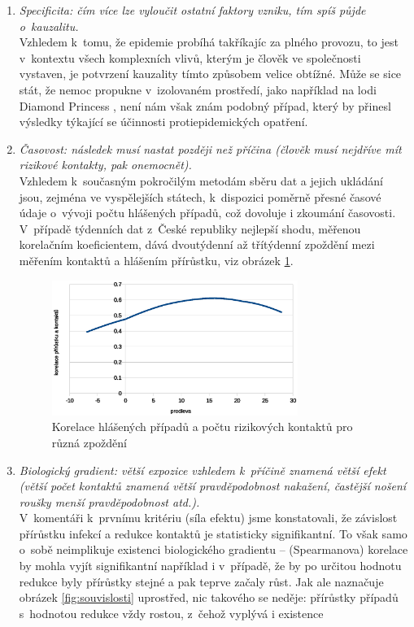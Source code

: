 \begin{enumerate}
\item \emph{Specificita: čím více lze vyloučit ostatní faktory vzniku, tím
spíš půjde o~kauzalitu.}\\
Vzhledem k~tomu, že epidemie probíhá takříkajíc za plného provozu,
to jest v~kontextu všech komplexních vlivů, kterým je člověk ve společnosti
vystaven, je potvrzení kauzality tímto způsobem velice obtížné.
Může se sice stát, že nemoc propukne v~izolovaném prostředí, jako
například na lodi Diamond Princess \cite{mizumoto2020transmission},
není nám však znám podobný případ, který by přinesl výsledky týkající
se účinnosti protiepidemických opatření. 
\item \emph{Časovost: následek musí nastat později než příčina (člověk musí
nejdříve mít rizikové kontakty, pak onemocnět).}\\
Vzhledem k~současným pokročilým metodám sběru dat a jejich ukládání
jsou, zejména ve vyspělejších státech, k~dispozici poměrně přesné
časové údaje o~vývoji počtu hlášených případů, což dovoluje i zkoumání časovosti.
V~případě týdenních dat z~České republiky nejlepší shodu, měřenou
korelačním koeficientem, dává dvoutýdenní až třítýdenní zpoždění mezi měřením
kontaktů a hlášením přírůstku, viz obrázek \ref{fig:korelace}.
\begin{figure}
\begin{center}
\includegraphics[width=8cm]{pic/lagsel.eps}
\caption{Korelace hlášených případů a počtu rizikových kontaktů pro různá zpoždění}
\label{fig:korelace}
\end{center}
\end{figure}
\item \emph{Biologický gradient: větší expozice vzhledem k~příčině znamená
větší efekt (větší počet kontaktů znamená větší pravděpodobnost nakažení,
častější nošení roušky menší pravděpodobnost atd.).}\\
V~komentáři k~prvnímu kritériu (síla efektu) jsme konstatovali, že závislost přírůstku infekcí a redukce kontaktů je statisticky signifikantní. To však samo o~sobě neimplikuje existenci biologického gradientu -- (Spearmanova) korelace by mohla vyjít signifikantní například i v~případě, že by po určitou hodnotu redukce byly přírůstky stejné a pak teprve začaly růst. Jak ale naznačuje obrázek \ref{fig:souvislosti} uprostřed, nic takového se neděje: přírůstky případů s~hodnotou redukce vždy rostou, z~čehož vyplývá i existence

\end{enumerate}
